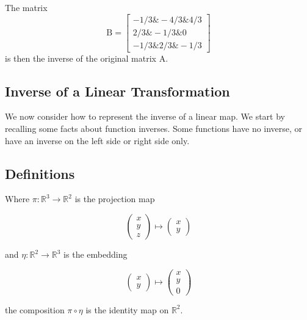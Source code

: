 The matrix 
$$
\mathrm{B} = \begin{bmatrix}
  -1/3 \& -4/3 \& 4/3 \\  2/3 \& -1/3 \& 0 \\  -1/3 \& 2/3 \& -1/3
\end{bmatrix}$$ 
is then the inverse of the original matrix A.


\subsection{Inverse of a Linear Transformation}
\label{sss:inve-93e2}

We now consider how to represent the inverse of a linear map. We start by recalling some
facts about function inverses. Some functions have no inverse, or have an inverse on the
left side or right side only.

\subsection{Definitions}
\label{sss:defi-9fdc}

Where $\pi:\mathbb{R}^3\to \mathbb{R}^2$ is the projection map

$$
\begin{pmatrix} x \\  y \\ z \end{pmatrix}
\mapsto
\begin{pmatrix} x \\ y \end{pmatrix}
$$

and $\eta:\mathbb{R}^2\to \mathbb{R}^3$ is the embedding

$$
\begin{pmatrix} x \\ y \end{pmatrix}
\mapsto
\begin{pmatrix} x \\ y \\ 0 \end{pmatrix}
$$

the composition $\pi\circ \eta$ is the identity map on $\mathbb{R}^2$.

